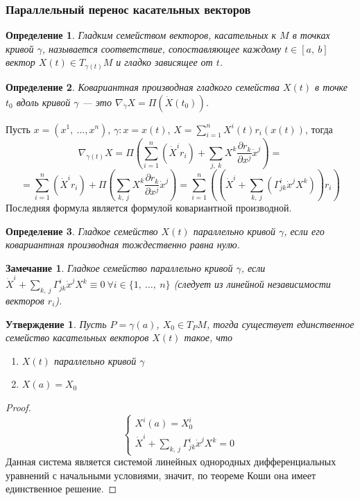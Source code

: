 \documentclass[12pt]{article}
\theoremstyle{plain}
\newtheorem{subtheorem}{Утверждение}[section]
\newtheorem{definition}{Определение}[section]
\newtheorem{remark}{Замечание}
\begin{document}
    \subsubsection{Параллельный перенос касательных векторов}
    \begin{definition}
        Гладким семейством векторов, касательных к $M$ в точках кривой $\gamma$, называется соответствие, сопоставляющее каждому $t\in[a, \ b]$ вектор $X(t)\in T_{\gamma(t)}M$ и гладко зависящее от $t$.
    \end{definition}
    \begin{definition}
        Ковариантная производная гладкого семейства $X(t)$ в точке $t_0$ вдоль кривой $\gamma$ --- это $\nabla_{\dot{\gamma}}X=\Pi(\dot{X}(t_0))$.
    \end{definition}
    Пусть $x=(x^1, \ \ldots, x^n)$, $\gamma: x=x(t)$, $X=\sum\limits_{i=1}^nX^i(t)r_i(x(t))$, тогда $$\nabla_{\dot{\gamma}(t)}X=\Pi\left(\sum\limits_{i=1}^n(\dot{X}^ir_i)+\sum\limits_{j, \ k}X^k\frac{\partial r_k}{\partial x^j}\dot{x}^j\right)=$$
    $$=\sum\limits_{i=1}^n(\dot{X}^ir_i)+\Pi\left(\sum\limits_{k, \ j}X^k\frac{\partial r_k}{\partial x^j}\dot{x}^j\right)=\sum\limits_{i=1}^n\left((\dot{X}^i+\sum\limits_{k, \ j}\left(\Gamma_{jk}^i\dot{x}^jX^k\right))r_i\right)$$
    Последняя формула является формулой ковариантной производной.
    \begin{definition}
        Гладкое семейство $X(t)$ параллельно кривой $\gamma$, если его ковариантная производная тождественно равна нулю.
    \end{definition}
    \begin{remark}
        Гладкое семейство параллельно кривой $\gamma$, если $\dot{X}^i+\sum\limits_{k, \ j}\Gamma_{jk}^i\dot{x}^jX^k\equiv0 \ \forall i\in\{1, \ \ldots, \ n\}$ (следует из линейной независимости векторов $r_i$).
    \end{remark}
    \begin{subtheorem}
        Пусть $P=\gamma(a)$, $X_0\in T_PM$, тогда существует единственное семейство касательных векторов $X(t)$ такое, что
        \begin{enumerate}
            \item $X(t)$ параллельно кривой $\gamma$
            \item $X(a)=X_0$
        \end{enumerate}
    \end{subtheorem}
    \begin{proof}
        $$\begin{cases}
            X^i(a)=X_0^i\\
            \dot{X}^i+\sum\limits_{k, \ j}\Gamma_{jk}^i\dot{x}^jX^k=0
        \end{cases}$$
        Данная система является системой линейных однородных дифференциальных уравнений с начальными условиями, значит, по теореме Коши она имеет единственное решение.
    \end{proof}
\end{document}
